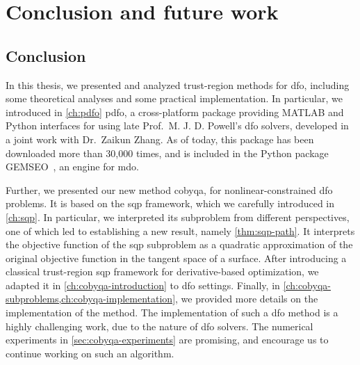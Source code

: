 %
%
%
\chapter*{Conclusion and future work}
\label{ch:conclusion}

\section*{Conclusion}

In this thesis, we presented and analyzed trust-region methods for \gls{dfo}, including some theoretical analyses and some practical implementation.
In particular, we introduced in \cref{ch:pdfo} \gls{pdfo}, a cross-platform package providing MATLAB and Python interfaces for using late Prof.\ M. J. D. Powell's \gls{dfo} solvers, developed in a joint work with Dr.\ Zaikun Zhang.
As of today, this package has been downloaded more than 30,000 times, and is included in the Python package GEMSEO~\cite{Gallard_Etal_2018}, an engine for \gls{mdo}.

Further, we presented our new method \gls{cobyqa}, for nonlinear-constrained \gls{dfo} problems.
It is based on the \gls{sqp} framework, which we carefully introduced in \cref{ch:sqp}.
In particular, we interpreted its subproblem from different perspectives, one of which led to establishing a new result, namely \cref{thm:sqp-path}.
It interprets the objective function of the \gls{sqp} subproblem as a quadratic approximation of the original objective function in the tangent space of a surface.
After introducing a classical trust-region \gls{sqp} framework for derivative-based optimization, we adapted it in \cref{ch:cobyqa-introduction} to \gls{dfo} settings.
Finally, in \cref{ch:cobyqa-subproblems,ch:cobyqa-implementation}, we provided more details on the implementation of the method.
The implementation of such a \gls{dfo} method is a highly challenging work, due to the nature of \gls{dfo} solvers.
The numerical experiments in \cref{sec:cobyqa-experiments} are promising, and encourage us to continue working on such an algorithm.

